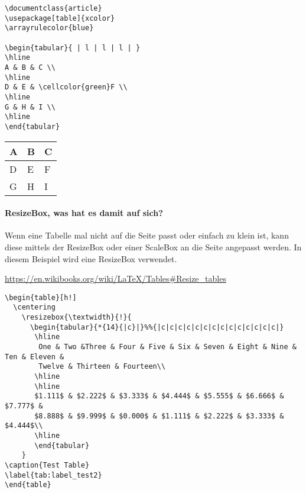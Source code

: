 \begin{lstlisting}[style=Latex,caption={Einfache Tabelle mit Einfärbung von Zellen},label=lst:tab9]
\documentclass{article}
\usepackage[table]{xcolor}
\arrayrulecolor{blue}

\begin{tabular}{ | l | l | l | }
\hline
A & B & C \\
\hline
D & E & \cellcolor{green}F \\
\hline
G & H & I \\
\hline
\end{tabular}

\end{lstlisting}


\begin{tabular}{ | l | l | l | }
	\hline
	A & B & C \\
	\hline
	D & E & \cellcolor{green}F \\
	\hline
	G & H & I \\
	\hline
\end{tabular}
\paragraph{ResizeBox, was hat es damit auf sich?}

Wenn eine Tabelle mal nicht auf die Seite passt oder einfach zu klein ist, kann diese mittels der ResizeBox oder einer ScaleBox an die Seite angepasst werden. In diesem Beispiel wird eine ResizeBox verwendet.

\url{https://en.wikibooks.org/wiki/LaTeX/Tables#Resize_tables}

\begin{lstlisting}[style=Latex,caption={Beispiel für ResizeBox},label=lst:tab10]
\begin{table}[h!]
  \centering
    \resizebox{\textwidth}{!}{
      \begin{tabular}{*{14}{|c}|}%%{|c|c|c|c|c|c|c|c|c|c|c|c|c|c|}
       \hline
        One & Two &Three & Four & Five & Six & Seven & Eight & Nine & Ten & Eleven &
        Twelve & Thirteen & Fourteen\\
       \hline
       \hline
       $1.111$ & $2.222$ & $3.333$ & $4.444$ & $5.555$ & $6.666$ & $7.777$ &
       $8.888$ & $9.999$ & $0.000$ & $1.111$ & $2.222$ & $3.333$ & $4.444$\\
       \hline
       \end{tabular}
    }
\caption{Test Table}
\label{tab:label_test2}
\end{table}
\end{lstlisting}

